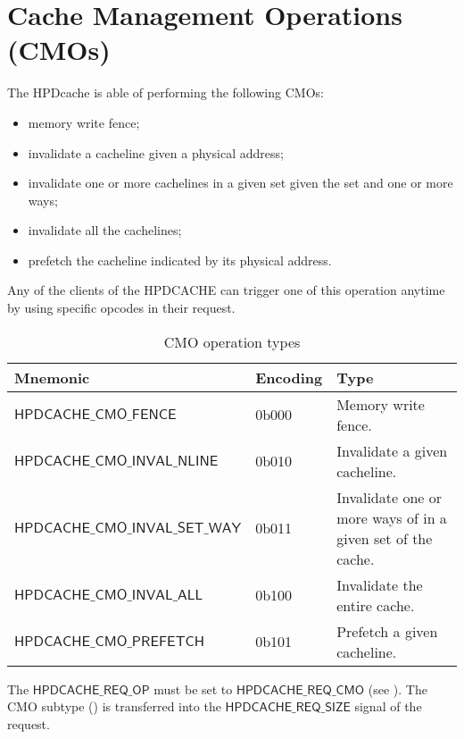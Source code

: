 \documentclass[10pt,titlepage,twoside]{book}
\begin{document}
\chapter{Cache Management Operations (CMOs)}
\minitoc
\newpage

The \ac{HPDcache} is able of performing the following \aclp{CMO}:

\begin{itemize}
  \item memory write fence;
  \item invalidate a cacheline given a physical address;
  \item invalidate one or more cachelines in a given set given the set and one or more ways;
  \item invalidate all the cachelines;
  \item prefetch the cacheline indicated by its physical address.
\end{itemize}

Any of the clients of the HPDCACHE can trigger one of this operation anytime by using specific opcodes in their request.

\begin{table}[h!]
\begin{center}
\caption{CMO operation types}%
{\footnotesize
\begin{tabular}{lll}
  \toprule
  \textbf{Mnemonic}
  & \textbf{Encoding}
  & \textbf{Type} \\
  \midrule
  $\mathsf{HPDCACHE\_CMO\_FENCE}$
  & 0b000
  & Memory write fence.\\
  \midrule
  $\mathsf{HPDCACHE\_CMO\_INVAL\_NLINE}$
  & 0b010
  & Invalidate a given cacheline.\\
  \midrule
  $\mathsf{HPDCACHE\_CMO\_INVAL\_SET\_WAY}$
  & 0b011
  & Invalidate one or more ways of in a given set of the cache.\\
  \midrule
  $\mathsf{HPDCACHE\_CMO\_INVAL\_ALL}$
  & 0b100
  & Invalidate the entire cache.\\
  \midrule
  $\mathsf{HPDCACHE\_CMO\_PREFETCH}$
  & 0b101
  & Prefetch a given cacheline.\\
  \midrule
\end{tabular}}
\end{center}
\end{table}

The $\mathsf{HPDCACHE\_REQ\_OP}$ must be set to $\mathsf{HPDCACHE\_REQ\_CMO}$ (see ).
The \ac{CMO} subtype () is transferred into the $\mathsf{HPDCACHE\_REQ\_SIZE}$ signal of the request.
\end{document}
